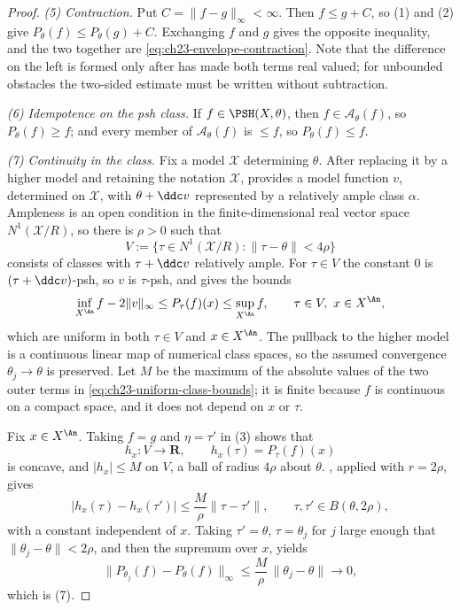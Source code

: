 \begin{proof}
\emph{(5) Contraction.}  Put $C=\|f-g\|_\infty<\infty$.  Then $f\leq g+C$,
so (1) and (2) give $P_\theta(f)\leq P_\theta(g)+C$.  Exchanging $f$ and
$g$ gives the opposite inequality, and the two together are
\eqref{eq:ch23-envelope-contraction}.  Note that the difference on the left
is formed only after  has made both terms
real valued; for unbounded obstacles the two-sided estimate must be written
without subtraction.

\emph{(6) Idempotence on the psh class.}  If $f\in\PSH(X,\theta)$, then
$f\in\mathcal A_\theta(f)$, so $P_\theta(f)\geq f$; and every member of
$\mathcal A_\theta(f)$ is $\leq f$, so $P_\theta(f)\leq f$.

\emph{(7) Continuity in the class.}  Fix a model $\mathcal X$ determining
$\theta$.  After replacing it by a higher model and retaining the notation
$\mathcal X$,
 provides a model function $v$,
determined on $\mathcal X$, with $\theta+\ddc v$ represented by a relatively ample
class $\alpha$.  Ampleness is an open condition in the finite-dimensional
real vector space $N^1(\mathcal X/R)$, so there is $\rho>0$ such that
\[
 V:=\{\tau\in N^1(\mathcal X/R):\|\tau-\theta\|<4\rho\}
\]
consists of classes with $\tau+\ddc v$ relatively ample.  For
$\tau\in V$ the constant $0$ is $(\tau+\ddc v)$-psh, so $v$ is
$\tau$-psh, and  gives the bounds
\begin{equation}\label{eq:ch23-uniform-class-bounds}
       \inf_{X^{\An}} f-2\|v\|_\infty
       \leq P_\tau(f)(x)\leq\sup_{X^{\An}} f,
       \qquad \tau\in V,\ x\in X^{\An},
\end{equation}
which are uniform in both $\tau\in V$ and $x\in X^{\An}$.  The pullback
to the higher model is a continuous linear map of numerical class spaces,
so the assumed convergence $\theta_j\to\theta$ is preserved.  Let $M$ be
the maximum of the absolute values of the two outer terms in
\eqref{eq:ch23-uniform-class-bounds}; it is finite because $f$ is
continuous on a compact space, and it does not depend on $x$ or $\tau$.

Fix $x\in X^{\An}$.  Taking $f=g$ and $\eta=\tau'$ in (3) shows that
\[
 h_x:V\longrightarrow\mathbf R,
 \qquad h_x(\tau)=P_\tau(f)(x)
\]
is concave, and $|h_x|\leq M$ on $V$, a ball of radius $4\rho$
about $\theta$.  , applied with
$r=2\rho$, gives
\[
 |h_x(\tau)-h_x(\tau')|\leq\frac{M}{\rho}\|\tau-\tau'\|,
 \qquad\tau,\tau'\in B(\theta,2\rho),
\]
with a constant independent of $x$.  Taking $\tau'=\theta$, $\tau=\theta_j$
for $j$ large enough that $\|\theta_j-\theta\|<2\rho$, and then the
supremum over $x$, yields
\[
       \|P_{\theta_j}(f)-P_\theta(f)\|_\infty
       \leq \frac{M}{\rho}\,\|\theta_j-\theta\|\longrightarrow0 ,
\]
which is (7).
\end{proof}

